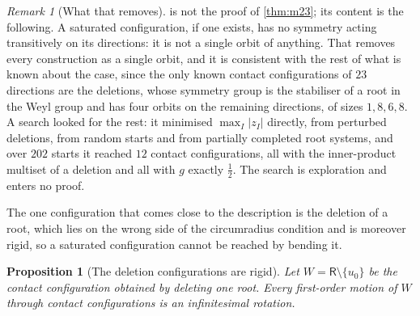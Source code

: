 \documentclass[11pt,reqno]{amsart}
\renewcommand{\_}{\origunderscore\allowbreak}
\numberwithin{equation}{section}
\theoremstyle{plain}
\newtheorem{prop}[thm]{Proposition}
\theoremstyle{definition}
\theoremstyle{remark}
\newtheorem{remark}[thm]{Remark}
\newcommand{\Rt}{\mathsf{R}}                 %
\newcommand{\base}{u}                        %
\begin{document}
\begin{remark}[What that removes]\label{rem:no-transitive}
 is not the proof of \cref{thm:m23}; its
content is the following. A saturated configuration, if one exists,
has no symmetry acting transitively on its directions: it is not a single
orbit of anything. That removes every construction as a single orbit,
and it is consistent with the rest of what is known about the case, since
the only known contact configurations of $23$ directions are the
deletions, whose symmetry group is the stabiliser of a root in the Weyl
group and has four orbits on the remaining directions, of sizes
$1,8,6,8$. A search looked for the rest: it minimised $\max_I|z_I|$
directly, from perturbed deletions, from random starts and from partially
completed root systems, and over $202$ starts it reached $12$ contact
configurations, all with the inner-product multiset of a deletion and all
with $g$ exactly $\tfrac12$. The search is exploration and enters no
proof.
\end{remark}

The one configuration that comes close to the description is the
deletion of a root, which lies on the wrong side of the circumradius
condition and is moreover rigid, so a saturated configuration cannot
be reached by bending it.

\begin{prop}[The deletion configurations are rigid]\label{prop:deletion-rigid}
Let $W=\Rt\setminus\{\base_0\}$ be the contact configuration obtained by
deleting one root. Every first-order motion of $W$ through contact
configurations is an infinitesimal rotation.
\end{prop}
\end{document}
